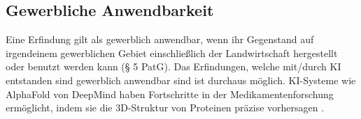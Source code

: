 \subsection{Gewerbliche Anwendbarkeit}
Eine Erfindung gilt als gewerblich anwendbar, 
wenn ihr Gegenstand auf irgendeinem gewerblichen
Gebiet einschließlich der Landwirtschaft hergestellt 
oder benutzt werden kann (§ 5 PatG).
Das Erfindungen, 
welche mit/durch KI entstanden sind gewerblich anwendbar sind ist durchaus möglich.
KI-Systeme wie AlphaFold von DeepMind haben Fortschritte 
in der Medikamentenforschung ermöglicht, 
indem sie die 3D-Struktur von Proteinen präzise vorhersagen \cite{AlphaFold2024}.
\\





